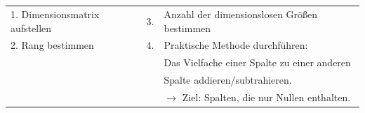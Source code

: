  \\ \vspace{2mm}
 \\ \vspace{3mm}
\begin{tabular}{l l l}
    1. Dimensionsmatrix aufstellen \qquad & 3. & \hspace{-4mm} Anzahl der dimensionslosen Größen bestimmen \\[1.0ex]
    2. Rang bestimmen                     & 4. & \hspace{-4mm} Praktische Methode durchführen:             \\[1.0ex]
                                          &    & \hspace{-4mm} Das Vielfache einer Spalte zu einer anderen \\
                                          &    & \hspace{-4mm} Spalte addieren/subtrahieren.               \\
                                          &    & \hspace{-4mm} $\rightarrow$ Ziel: Spalten, die nur Nullen enthalten.
\end{tabular}
\vspace{5mm}

